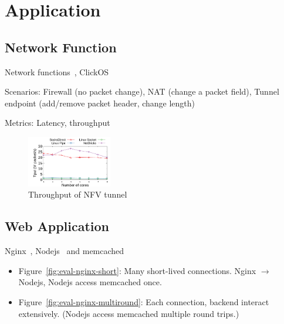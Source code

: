 \section{Application}
\label{sec:application}

\subsection{Network Function}

Network functions~\cite{li2016clicknp}, ClickOS~\cite{martins2014clickos}

Scenarios: Firewall (no packet change), NAT (change a packet field), Tunnel endpoint (add/remove packet header, change length)

Metrics: Latency, throughput

\begin{figure}[htpb]
	\centering
	\includegraphics[width=0.33\textwidth]{eval/microbenchmark/nfv-tun-tput.pdf}
	\caption{Throughput of NFV tunnel}
	\label{fig:eval-tun-tput}
\end{figure}



\subsection{Web Application}

Nginx~\cite{nginx}, Nodejs~\cite{nodejs} and memcached~\cite{memcached}

\begin{itemize}
	\item Figure~\ref{fig:eval-nginx-short}: Many short-lived connections. Nginx $\rightarrow$ Nodejs, Nodejs access memcached once.
	\item Figure~\ref{fig:eval-nginx-multiround}: Each connection, backend interact extensively. (Nodejs access memcached multiple round trips.)
\end{itemize}

